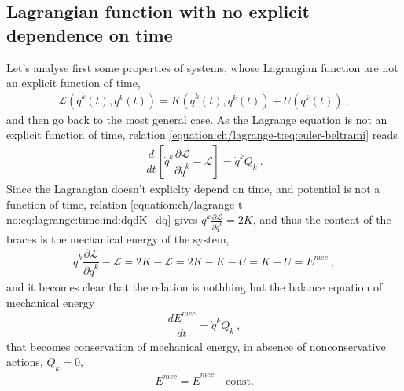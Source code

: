 \documentclass[letterpaper,10pt,english]{jupyterBook}
\begin{document}
\subsection{Lagrangian function with no explicit dependence on time}
\label{\detokenize{ch/lagrange-t-no:lagrangian-function-with-no-explicit-dependence-on-time}}\label{\detokenize{ch/lagrange-t-no:classical-mechanics-lagrange-time-independent}}\label{\detokenize{ch/lagrange-t-no::doc}}
\sphinxAtStartPar
Let’s analyse first some properties of systems, whose Lagrangian function are not an explicit function of time,
\begin{equation*}
\begin{split}\mathscr{L}(\dot{q}^k(t), q^k(t)) = K(\dot{q}^k(t), q^k(t)) + U(q^k(t)) \ ,\end{split}
\end{equation*}
\sphinxAtStartPar
and then go back to the most general case.
As the Lagrange equation is not an explicit function of time, relation \eqref{equation:ch/lagrange-t:eq:euler-beltrami} reads
\begin{equation*}
\begin{split}\dfrac{d}{dt} \left[ \dot{q}^k \dfrac{\partial \mathscr{L}}{\partial \dot{q}^k} - \mathscr{L} \right] = \dot{q}^k Q_k \ .\end{split}
\end{equation*}
\sphinxAtStartPar
Since the Lagrangian doesn’t expliclty depend on time, and potential is not a function of time, relation \eqref{equation:ch/lagrange-t-no:eq:lagrange:time:ind:dqdK_dq} gives \(\dot{q}^k \frac{\partial \mathscr{L}}{\partial \dot{q}^k} = 2 K\), and thus the content of the braces is the mechanical energy of the system,
\begin{equation*}
\begin{split}\dot{q}^k \dfrac{\partial \mathscr{L}}{\partial \dot{q}^k} - \mathscr{L} = 2 K - \mathscr{L} = 2 K - K - U = K - U = E^{mec} \ ,\end{split}
\end{equation*}
\sphinxAtStartPar
and it becomes clear that the relation is nothhing but the balance equation of mechanical energy
\begin{equation*}
\begin{split}\dfrac{d E^{mec}}{dt} = \dot{q}^k Q_k \ ,\end{split}
\end{equation*}
\sphinxAtStartPar
that becomes conservation of mechanical energy, in absence of non\sphinxhyphen{}conservative actions, \(Q_k = 0\),
\begin{equation*}
\begin{split}E^{mec} = \overline{E}^{mec} \quad \text{const.}\end{split}
\end{equation*}
\end{document}
